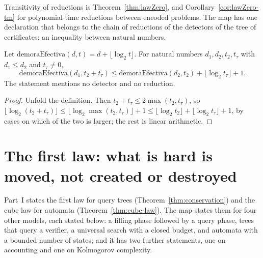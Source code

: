 Transitivity of reductions is Theorem~\ref{thm:lawZero}, and Corollary~\ref{cor:lawZero-tm} for
polynomial-time reductions between encoded problems. The map has one declaration that belongs to the
chain of reductions of the detectors of the tree of certificates: an inequality between natural
numbers.

\begin{theorem}
  \label{thm:arrow-effective-delay}
  \leanok
  Let $\mathrm{demoraEfectiva}(d, t) = d + \lfloor \log_2 t \rfloor$. For natural numbers $d_1, d_2,
  t_2, t_\tau$ with $d_1 \le d_2$ and $t_\tau \neq 0$,
  \[
    \mathrm{demoraEfectiva}(d_1, t_2 + t_\tau) \le \mathrm{demoraEfectiva}(d_2, t_2) + \lfloor \log_2 t_\tau \rfloor + 1.
  \]
  The statement mentions no detector and no reduction.
  \own{}
\end{theorem}

\begin{proof}
  \leanok
  Unfold the definition. Then $t_2 + t_\tau \le 2 \max(t_2, t_\tau)$, so $\lfloor \log_2 (t_2 + t_\tau) \rfloor
  \le \lfloor \log_2 \max(t_2, t_\tau) \rfloor + 1 \le \lfloor \log_2 t_2 \rfloor + \lfloor \log_2 t_\tau
  \rfloor + 1$, by cases on which of the two is larger; the rest is linear arithmetic.
\end{proof}

\section{The first law: what is hard is moved, not created or destroyed}
\label{sec:arrow-first}

Part~I states the first law for query trees (Theorem~\ref{thm:conservation}) and the cube law for
automata (Theorem~\ref{thm:cube-law}). The map states them for four other models, each stated
below: a filling phase followed by a query phase, trees that query a verifier, a universal search
with a closed budget, and automata with a bounded number of states; and it has two further
statements, one on accounting and one on Kolmogorov complexity.

